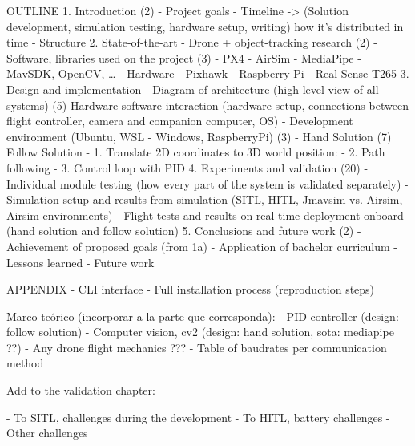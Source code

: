 OUTLINE
1. Introduction (2)
 	- Project goals
	- Timeline -> (Solution development, simulation testing, hardware setup, writing) how it's distributed in time
	- Structure
2. State-of-the-art
	- Drone + object-tracking research (2)
	- Software, libraries used on the project (3)
		- PX4
		- AirSim
		- MediaPipe
		- MavSDK, OpenCV, …
	- Hardware
	    - Pixhawk
	    - Raspberry Pi
	    - Real Sense T265
3. Design and implementation
	- Diagram of architecture (high-level view of all systems) (5)
      Hardware-software interaction (hardware setup, connections between flight controller, camera and companion computer, OS)
	- Development environment (Ubuntu, WSL - Windows, RaspberryPi) (3)
	- Hand Solution (7)
      Follow Solution
	     - 1. Translate 2D coordinates to 3D world position:
	     - 2. Path following
	     - 3. Control loop with PID
4. Experiments and validation (20)
	- Individual module testing (how every part of the system is validated separately)
	- Simulation setup and results from simulation (SITL, HITL, Jmavsim vs. Airsim, Airsim environments)
	- Flight tests and results on real-time deployment onboard (hand solution and follow solution)
5. Conclusions and future work (2)
	- Achievement of proposed goals (from 1a)
	- Application of bachelor curriculum
	- Lessons learned
	- Future work

APPENDIX
	- CLI interface
	- Full installation process (reproduction steps)
	
Marco teórico (incorporar a la parte que corresponda):
 - PID controller (design: follow solution)
 - Computer vision, cv2 (design: hand solution, sota: mediapipe ??)
 - Any drone flight mechanics ???
 - Table of baudrates per communication method




 Add to the validation chapter:

 - To SITL, challenges during the development
 - To HITL, battery challenges
 - Other challenges